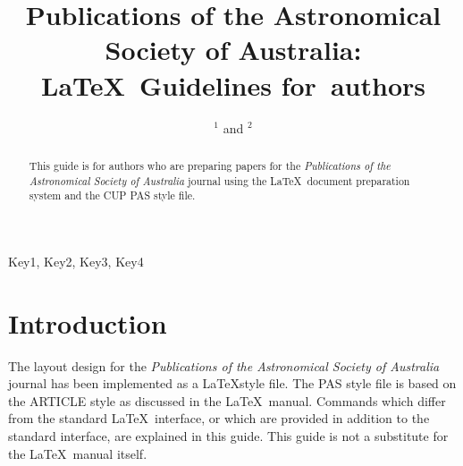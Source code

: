 \documentclass{pas}
\begin{document}



\title{Publications of the Astronomical Society of Australia: \LaTeX\ Guidelines for~authors}

\author{ $^{1}$ and  $^{2}$}





\begin{abstract}
This guide is for authors who are preparing papers for the {\em Publications of the Astronomical Society of Australia} journal using the \LaTeX\ document preparation
system and the CUP PAS style file.
\end{abstract}

\begin{keywords}
Key1, Key2, Key3, Key4
\end{keywords}

\maketitle

\section{Introduction}

The layout design for the {\em Publications of the Astronomical Society of Australia} journal
has been implemented as a \LaTeX style file. The PAS style file is based
on the ARTICLE style as discussed in the \LaTeX\ manual. Commands which
differ from the standard \LaTeX\ interface, or which are provided in addition
to the standard interface, are explained in this guide. This guide is not a
substitute for the \LaTeX\ manual itself.
\end{document}
